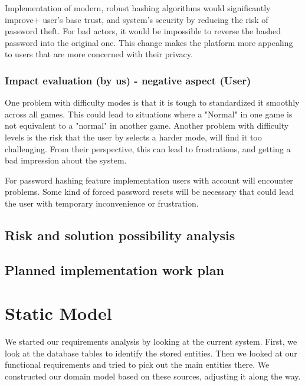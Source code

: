 \documentclass[11pt,a4paper]{article}
\begin{document}
Implementation of modern, robust hashing algorithms would significantly improve+ user's base trust, and system's security by reducing the risk of password theft. For bad actors, it would be impossible to reverse the hashed password into the original one. This change makes the platform more appealing to users that are more concerned with their privacy.



\subsubsection{Impact evaluation (by us) - negative aspect (User)}
One problem with difficulty modes is that it is tough to standardized it smoothly across all games. This could lead to situations where a "Normal" in one game is not equivalent to a "normal" in another game. Another problem with difficulty levels is the risk that the user by selects a harder mode, will find it too challenging. From their perspective, this can lead to frustrations, and getting a bad impression about the system.

For password hashing feature implementation users with account will encounter problems. Some kind of forced password resets will be necessary that could lead the user with temporary inconvenience or frustration.




\subsection{Risk and solution possibility analysis}



\subsection{Planned implementation work plan}



\section{Static Model}
We started our requirements analysis by looking at the current system. First, we look at the database tables to identify the stored entities. Then we looked at our functional requirements and tried to pick out the main entities there. We constructed our domain model based on these sources, adjusting it along the way.
\end{document}
